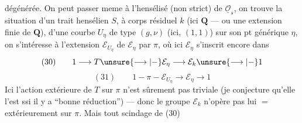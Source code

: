 dégénérée. On peut passer meme à
l'hensélisé (non strict) de $\underline{\mathcal O}_s$, on
trouve la situation d'un trait hensélien
$S$, à corps résiduel $k$ (ici $\mathbf Q$ --- ou une
extension finie de $\mathbf Q$), d'une
courbe $U_\eta$ de type $(g,\nu)$ (ici, $(1,1)$)
sur son pt générique $\eta$, on s'intéresse
à l'extension $\mathcal E_{U_\eta}$ de $\mathcal E_\eta$ par $\pi$,
où ici $\mathcal E_\eta$ s'inscrit encore dans
\[
(30)\qquad 1\longrightarrow T\unsure{\longrightarrow|-}\mathcal E_\eta\longrightarrow\mathcal E_k\unsure{\longrightarrow|-}1
\]
\[
(31)\qquad 1-\pi-\mathcal E_{U_\eta}\longrightarrow\mathcal E_\eta\longrightarrow1
\]
Ici l'action extérieure de $T$ sur
$\pi$ n'est sûrement pas triviale (je
conjecture qu'elle l'est ssi il y
a ``bonne réduction'') --- donc le groupe
$\mathcal E_k$ n'opère pas lui $=$ extérieurement
sur $\pi$. Mais tout scindage de (30)
